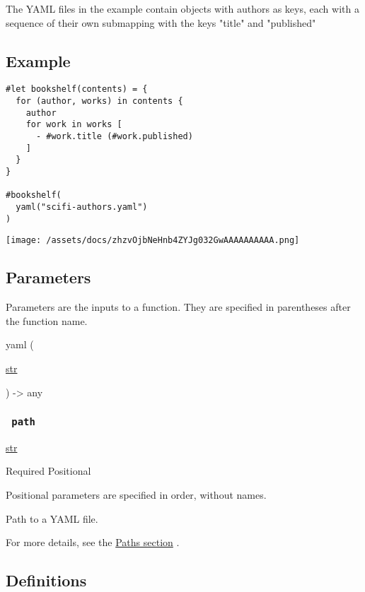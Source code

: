 The YAML files in the example contain objects with authors as keys, each
with a sequence of their own submapping with the keys "title" and
"published"

\subsection{Example}\label{example}

\begin{verbatim}
#let bookshelf(contents) = {
  for (author, works) in contents {
    author
    for work in works [
      - #work.title (#work.published)
    ]
  }
}

#bookshelf(
  yaml("scifi-authors.yaml")
)
\end{verbatim}

\texttt{[image: /assets/docs/zhzvOjbNeHnb4ZYJg032GwAAAAAAAAAA.png]}

\subsection{\texorpdfstring{{ Parameters
}}{ Parameters }}\label{parameters}

\label{parameters-tooltip}
Parameters are the inputs to a function. They are specified in
parentheses after the function name.

{ yaml } (

{ \href{/docs/reference/foundations/str/}{str} }

) -\textgreater{} { any }

\subsubsection{\texorpdfstring{\texttt{\ path\ }}{ path }}\label{parameters-path}

\href{/docs/reference/foundations/str/}{str}

{Required} {{ Positional }}

\label{parameters-path-positional-tooltip}
Positional parameters are specified in order, without names.

Path to a YAML file.

For more details, see the \href{/docs/reference/syntax/\#paths}{Paths
section} .

\subsection{\texorpdfstring{{ Definitions
}}{ Definitions }}\label{definitions}

